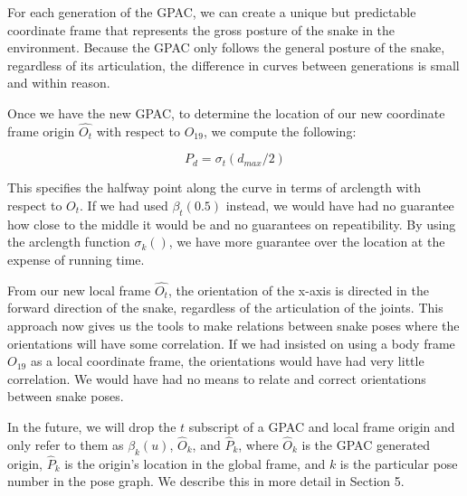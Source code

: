 


For each generation of the GPAC, we can create a unique but predictable coordinate frame that represents the gross posture of the snake in the environment. Because the GPAC only follows the general posture of the snake, regardless of its articulation, the difference in curves between generations is small and within reason.

Once we have the new GPAC, to determine the location of our new coordinate frame origin $\hat{O_t}$ with respect to $O_{19}$, we compute the following:


\begin{equation}
P_d = \sigma_t(d_{max} / 2)
\end{equation}


This specifies the halfway point along the curve in terms of arclength with respect to $O_t$. If we had used $\beta_t(0.5)$ instead, we would have had no guarantee how close to the middle it would be and no guarantees on repeatibility. By using the arclength function $\sigma_k()$, we have more guarantee over the location at the expense of running time.

From our new local frame $\hat{O_t}$, the orientation of the x-axis is directed in the forward direction of the snake, regardless of the articulation of the joints. This approach now gives us the tools to make relations between snake poses where the orientations will have some correlation. If we had insisted on using a body frame $O_{19}$ as a local coordinate frame, the orientations would have had very little correlation. We would have had no means to relate and correct orientations between snake poses.

In the future, we will drop the $t$ subscript of a GPAC and local frame origin and only refer to them as $\beta_k(u)$, $\hat{O}_k$, and $\hat{P}_k$, where $\hat{O}_k$ is the GPAC generated origin, $\hat{P}_k$ is the origin's location in the global frame, and $k$ is the particular pose number in the pose graph. We describe this in more detail in Section 5.

